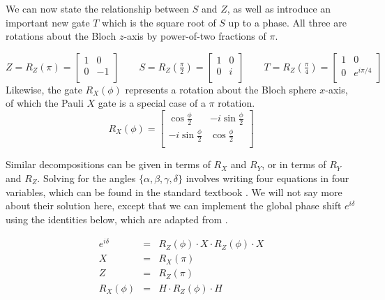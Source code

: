 We can now state the relationship between $S$ and $Z$, as well as introduce
an important new gate $T$ which is the square root of $S$ up to a phase. All three
are rotations about the Bloch $z$-axis by power-of-two fractions of $\pi$.

\begin{equation}
Z = R_Z(\pi) =
\left[
  \begin{array}{cc}
    1 & 0 \\
    0 & -1 \\
  \end{array} \right]
\qquad
S = R_Z(\tfrac{\pi}{2}) =
\left[
  \begin{array}{cc}
    1 & 0 \\
    0 & i \\
  \end{array} \right]
\qquad
T = R_Z(\tfrac{\pi}{4}) =
\left[
  \begin{array}{cc}
    1 & 0 \\
    0 & e^{i\pi / 4} \\
  \end{array} \right]
\end{equation}
%
Likewise, the gate $R_X(\phi)$ represents a rotation about the Bloch sphere $x$-axis,
of which the Pauli $X$ gate is a special case of a $\pi$ rotation.
%
\begin{equation}
R_X(\phi) =
\left[
  \begin{array}{cc}
    \cos \tfrac{\phi}{2} & -i \sin \tfrac{\phi}{2} \\
    -i \sin \tfrac{\phi}{2} & \cos \tfrac{\phi}{2} \\
  \end{array} \right]
\end{equation}

Similar decompositions can be given in terms of $R_X$ and $R_Y$, or in
terms of $R_Y$ and $R_Z$. Solving for the angles $\{ \alpha, \beta, \gamma, \delta \}$
involves writing four equations in four variables, which can be found in
the standard textbook \cite{Nielsen2000}. We will not say
more about their solution here, except that we can implement the
global phase shift $e^{i\delta}$ using the identities below, which are
adapted from \cite{Kitaev2002}.

\begin{eqnarray}
e^{i\delta} & = & R_Z(\phi)\cdot X \cdot R_Z(\phi) \cdot X \\
X & = & R_X(\pi) \\
Z & = & R_Z(\pi) \\
R_X(\phi) & = & H \cdot R_Z(\phi) \cdot H
\end{eqnarray}

